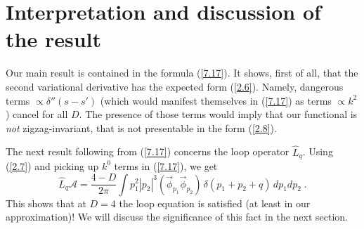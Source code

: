 \documentclass[a4paper,12pt]{article}
\numberwithin{equation}{section}
\begin{document}
\section{Interpretation and discussion of the result}

Our main result is contained in the formula (\ref{7.17}). It shows, first of
all, that the second variational derivative has the expected form (\ref{2.6}).
Namely, dangerous terms \( \propto \delta ''(s-s') \) (which would manifest
themselves in (\ref{7.17}) as terms \( \propto k^{2} \)) cancel for all \( D \).
The presence of those terms would imply that our functional is \emph{not} zigzag-invariant,
that is not presentable in the form (\ref{2.8}). 

The next result following from (\ref{7.17}) concerns the loop operator \( \widehat{{L}}_{q} \).
Using (\ref{2.7}) and picking up \( k^{0} \) terms in (\ref{7.17}), we get
\begin{equation}
\label{8.1}
\widehat{{L}}_{q}\mathcal{A}=\frac{4-D}{2\pi }\int p_{1}^{2}|p_{2}|^{3}\left( \vec{\phi }_{p_{1}}\vec{\phi }_{p_{2}}\right) \, \delta (p_{1}+p_{2}+q)\, dp_{1}dp_{2}\; .
\end{equation}
This shows that at \( D=4 \) the loop equation is satisfied (at least in our
approximation)! We will discuss the significance of this fact in the next section.
\end{document}
